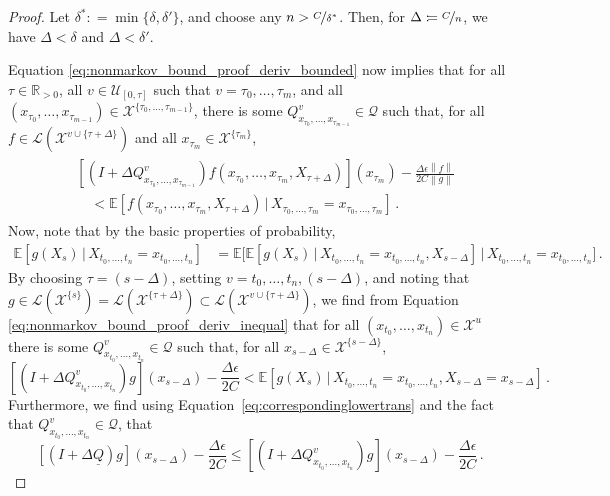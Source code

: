 \documentclass[10pt]{paper}
\theoremstyle{definition}
\newcommand{\reals}{\mathbb{R}}
\newcommand{\realspos}{\reals_{>0}}
\newcommand{\states}{\mathcal{X}}
\newcommand{\gambles}{\mathcal{L}}
\newcommand{\rateset}{\mathcal{Q}}
\newcommand{\lrate}{\underline{Q}}
\newcommand{\norm}[1]{\left\lVert #1 \right\rVert}
\newcommand{\coloneqq}{:\!=}
\begin{document}
\begin{proof}
Let $\delta^*\coloneqq\min\{\delta,\delta'\}$, and choose any $n>\nicefrac{C}{\delta^*}$. Then, for $\Delta\coloneqq\nicefrac{C}{n}$, we have $\Delta<\delta$ and $\Delta<\delta'$.

Equation \eqref{eq:nonmarkov_bound_proof_deriv_bounded} now implies that for all $\tau\in\realspos$, all $v\in\mathcal{U}_{[0,\tau]}$ such that $v=\tau_0,\ldots,\tau_m$, and all $(x_{\tau_0},\ldots,x_{\tau_{m-1}})\in\states^{\{\tau_0,\ldots,\tau_{m-1}\}}$, there is some $Q^v_{x_{\tau_0},\ldots,x_{\tau_{m-1}}}\in\rateset$ such that, for all $f\in\gambles(\states^{v\cup\{\tau+\Delta\}})$ and all $x_{\tau_m}\in\states^{\{\tau_m\}}$,
\begin{align}\label{eq:nonmarkov_bound_proof_deriv_inequal}
\begin{split}
 &\left[(I + \Delta Q^v_{x_{\tau_0},\ldots,x_{\tau_{m-1}}})f(x_{\tau_0},\ldots,x_{\tau_m},X_{\tau+\Delta})\right](x_{\tau_m}) - \frac{\Delta\epsilon\norm{f}}{2C\norm{g}} \\
 &\quad< \mathbb{E}[f(x_{\tau_0},\ldots,x_{\tau_m},X_{\tau+\Delta})\,\vert\,X_{\tau_0,\ldots,\tau_m}=x_{\tau_0,\ldots,\tau_m}]\,.
\end{split}
\end{align}
Now, note that by the basic properties of probability,
\begin{align*}
\mathbb{E}[g(X_s)\,\vert\,X_{t_0,\ldots,t_n}=x_{t_0,\ldots,t_n}] &= \mathbb{E}\bigl[\mathbb{E}[g(X_s)\,\vert\,X_{t_0,\ldots,t_n}=x_{t_0,\ldots,t_n},X_{s-\Delta}]\,\vert\,X_{t_0,\ldots,t_n}=x_{t_0,\ldots,t_n}\bigr]\,.
\end{align*}
By choosing $\tau=(s-\Delta)$, setting $v=t_0,\ldots,t_n,(s-\Delta)$, and noting that $g\in\gambles(\states^{\{s\}})=\gambles(\states^{\{\tau+\Delta\}})\subset\gambles(\states^{v\cup\{\tau+\Delta\}})$, we find from Equation \eqref{eq:nonmarkov_bound_proof_deriv_inequal} that for all $(x_{t_0},\ldots,x_{t_n})\in\states^{u}$ there is some $Q^v_{x_{t_0},\ldots,x_{t_n}}\in\rateset$ such that, for all $x_{s-\Delta}\in\states^{\{s-\Delta\}}$,
\begin{equation*}
\left[(I + \Delta Q^v_{x_{t_0},\ldots,x_{t_n}})g\right](x_{s-\Delta}) - \frac{\Delta\epsilon}{2C} < \mathbb{E}[g(X_s)\,\vert\,X_{t_0,\ldots,t_n}=x_{t_0,\ldots,t_n},X_{s-\Delta}=x_{s-\Delta}]\,.
\end{equation*}
Furthermore, we find using Equation~\eqref{eq:correspondinglowertrans} and the fact that $Q^v_{x_{t_0},\ldots,x_{t_n}}\in\rateset$, that
\begin{equation*}
\left[(I + \Delta \lrate)g\right](x_{s-\Delta}) - \frac{\Delta\epsilon}{2C} \leq \left[(I + \Delta Q^v_{x_{t_0},\ldots,x_{t_n}})g\right](x_{s-\Delta}) - \frac{\Delta\epsilon}{2C}\,.

\end{equation*}
\end{proof}
\end{document}
